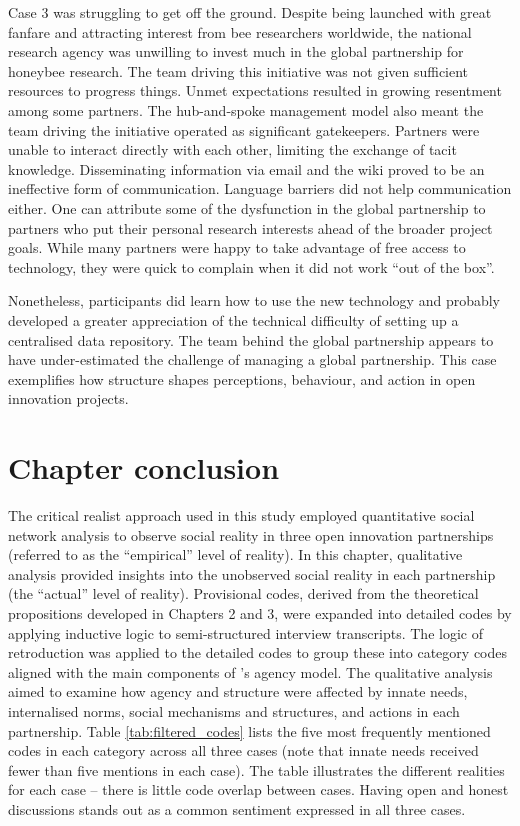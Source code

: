 Case 3 was struggling to get off the ground. Despite being launched with great fanfare and attracting interest from bee researchers worldwide, the national research agency was unwilling to invest much in the global partnership for honeybee research. The team driving this initiative was not given sufficient resources to progress things. Unmet expectations resulted in growing resentment among some partners. The hub-and-spoke management model also meant the team driving the initiative operated as significant gatekeepers. Partners were unable to interact directly with each other, limiting the exchange of tacit knowledge. Disseminating information via email and the wiki proved to be an ineffective form of communication. Language barriers did not help communication either. One can attribute some of the dysfunction in the global partnership to partners who put their personal research interests ahead of the broader project goals. While many partners were happy to take advantage of free access to technology, they were quick to complain when it did not work \enquote{out of the box}. \medskip

Nonetheless, participants did learn how to use the new technology and probably developed a greater appreciation of the technical difficulty of setting up a centralised data repository. The team behind the global partnership appears to have under-estimated the challenge of managing a global partnership. This case exemplifies how structure shapes perceptions, behaviour, and action in open innovation projects. 

\section{Chapter conclusion}

The critical realist approach used in this study employed quantitative social network analysis to observe social reality in three open innovation partnerships (referred to as the \enquote{empirical} level of reality). In this chapter, qualitative analysis provided insights into the unobserved social reality in each partnership (the \enquote{actual} level of reality). Provisional codes, derived from the theoretical propositions developed in Chapters 2 and 3, were expanded into detailed codes by applying inductive logic to semi-structured interview transcripts. The logic of retroduction was applied to the detailed codes to group these into category codes aligned with the main components of \citeauthor{loyal2001agency}'s \citeyearpar{loyal2001agency}  agency model. The qualitative analysis aimed to examine how agency and structure were affected by innate needs, internalised norms, social mechanisms and structures, and actions in each partnership. Table \ref{tab:filtered_codes} lists the five most frequently mentioned codes in each category across all three cases (note that innate needs received fewer than five mentions in each case). The table illustrates the different realities for each case --  there is little code overlap between cases. Having open and honest discussions stands out as a common sentiment expressed in all three cases. \medskip

